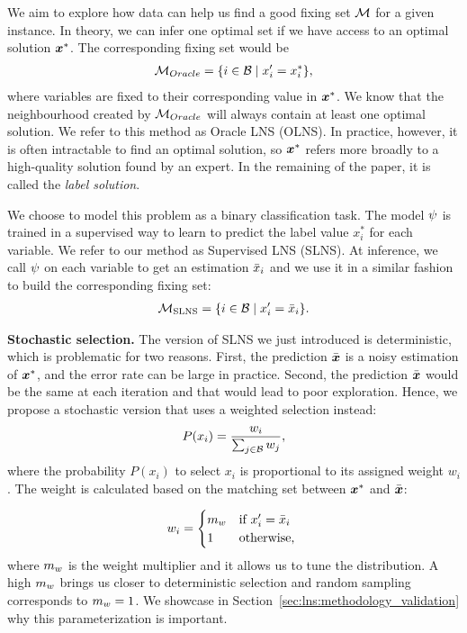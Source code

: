 \documentclass[3p, authoryear, times]{elsarticle}
\begin{document}
We aim to explore how data can help us find a good fixing set $\mathcal{M}$ for a given instance. In theory, we can infer one optimal set if we have access to an optimal solution $\boldsymbol{x}^*$.  The corresponding fixing set would be 
\begin{align}
    \mathcal{M}_{Oracle} = \{ i \in \mathcal{B} \mid  x_i' = x_i^* \},  \label{eq:oracle_matching_set}
\end{align}
where variables are fixed to their corresponding value in $\boldsymbol{x}^*$. We know that the neighbourhood created by $\mathcal{M}_{Oracle}$ will always contain at least one optimal solution. We refer to this method as Oracle LNS (OLNS). In practice, however, it is often intractable to find an optimal solution, so $\boldsymbol{x}^*$ refers more broadly to a high-quality solution found by an expert. In the remaining of the paper, it is called the \textit{label solution}. 

We choose to model this problem as a binary classification task. The model $\psi$ is trained in a supervised way to learn to predict the label value $x_i^*$ for each variable. We refer to our method as Supervised LNS (SLNS). At inference, we call $\psi$ on each variable to get an estimation $\bar{x}_i$ and we use it in a similar fashion to build the corresponding fixing set:
\begin{align}
    \mathcal{M}_{\text{SLNS}} = \{ i \in \mathcal{B} \mid  x_i' = \bar{x}_i \}. 
\end{align}

\textbf{Stochastic selection.} The version of SLNS we just introduced is deterministic, which is problematic for two reasons. First, the prediction $\bar{\boldsymbol{x}}$ is a noisy estimation of $\boldsymbol{x}^*$, and the error rate can be large in practice. Second, the prediction $\bar{\boldsymbol{x}}$ would be the same at each iteration and that would lead to poor exploration. Hence, we propose a stochastic version that uses a weighted selection instead: 
\begin{align}
    P(x_i) = \frac{w_i}{\sum_{j \in \mathcal{B} } w_j}, 
\end{align}
where the probability $P(x_i)$ to select $x_i$ is proportional to its assigned weight $w_i$. The weight is calculated based on the matching set between $\boldsymbol{x}^*$ and  $\bar{\boldsymbol{x}}$: 

\begin{align}
    w_i = \begin{cases}
        m_w & \text{if } x_i' = \bar{x}_i \\
        1 & \text{otherwise, }
    \end{cases}
\end{align}
where $m_w$ is the weight multiplier and it allows us to tune the distribution. A high $m_w$ brings us closer to deterministic selection and random sampling corresponds to $m_w = 1$. We showcase in Section~\ref{sec:lns:methodology_validation} why this parameterization is important. 
\end{document}
